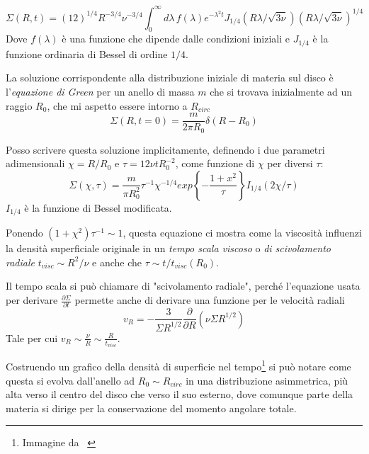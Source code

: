 \documentclass[a4paperbi]{article}
\begin{document}
	\begin{equation}
		\Sigma(R,t)=(12)^{1/4}R^{-3/4}\nu^{-3/4}\int^{\infty}_0d\lambda\,f(\lambda)e^{-\lambda^2t}J_{1/4}(R\lambda/\sqrt{3\nu})(R\lambda/\sqrt{3\nu})^{1/4}
	\end{equation}
	Dove $f(\lambda)$ è una funzione che dipende dalle condizioni iniziali e $J_{1/4}$ è la funzione ordinaria di Bessel di ordine $1/4$.
	
	La soluzione corrispondente alla distribuzione iniziale di materia sul disco è l'\textit{equazione di Green} per un anello di massa $m$ che si trovava inizialmente ad un raggio $R_0$, che mi aspetto essere intorno a $R_{circ}$
	\begin{equation}
		\Sigma(R,t=0)=\frac{m}{2\pi R_0}\delta(R-R_0)
	\end{equation}
	
	Posso scrivere questa soluzione implicitamente, definendo i due parametri adimensionali $\chi=R/R_0$ e $\tau=12\nu tR_0^{-2}$, come funzione di $\chi$ per diversi $\tau$:
	\begin{equation}
	\Sigma(\chi,\tau)=\frac{m}{\pi R_0^2}\tau^{-1}\chi^{-1/4}exp\left\{-\frac{1+x^2}{\tau}\right\}I_{1/4}(2\chi/\tau)
	\end{equation}
	$I_{1/4}$ è la funzione di Bessel modificata.
	
	Ponendo $(1+\chi^2)\tau^{-1}\sim 1$, questa equazione ci mostra come la viscosità influenzi la densità superficiale originale in un \textit{tempo scala viscoso} o \textit{di scivolamento radiale} $t_{visc}\sim R^2/\nu$ e anche che $\tau\sim t/t_{visc}(R_0)$.
	
	Il tempo scala si può chiamare di "scivolamento radiale", perché l'equazione usata per derivare $\frac{\partial\Sigma}{\partial t}$ permette anche di derivare una funzione per le velocità radiali
	\begin{equation}
		v_R=-\frac{3}{\Sigma R^{1/2}}\frac{\partial}{\partial R}(\nu\Sigma R^{1/2})
	\end{equation}
	Tale per cui $v_R\sim\frac{\nu}{R}\sim\frac{R}{t_{visc}}$.
	
	Costruendo un grafico della densità di superficie nel tempo\footnote{Immagine da ~\cite{Pringle1981}} si può notare come questa si evolva dall'anello ad $R_0\sim R_{circ}$ in una distribuzione asimmetrica, più alta verso il centro del disco che verso il suo esterno, dove comunque parte della materia si dirige per la conservazione del momento angolare totale.
	
\end{document}
